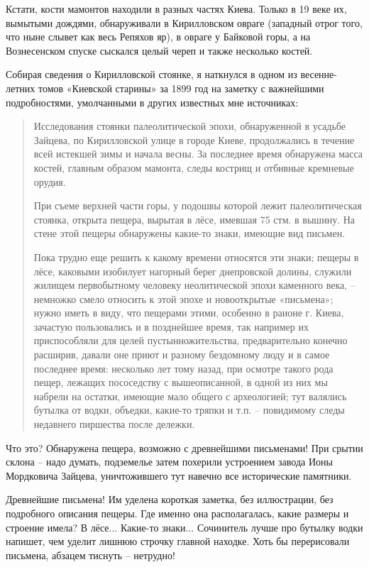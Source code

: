 Кстати, кости мамонтов находили в разных частях Киева. Только в 19 веке их, вымытыми дождями, обнаруживали в Кирилловском овраге (западный отрог того, что ныне слывет как весь Репяхов яр), в овраге у Байковой горы, а на Вознесенском спуске сыскался целый череп и также несколько костей.

Собирая сведения о Кирилловской стоянке, я наткнулся в одном из весенне-летних томов «Киевской старины» за 1899 год на заметку с важнейшими подробностями, умолчанными в других известных мне источниках:
 
\begin{quotation}
Исследования стоянки палеолитической эпохи, обнаруженной в усадьбе Зайцева, по Кирилловской улице в городе Киеве, продолжались в течение всей истекшей зимы и начала весны. За последнее время обнаружена масса костей, главным образом мамонта, следы кострищ и отбивные кремневые орудия.

При съеме верхней части горы, у подошвы которой лежит палеолитическая стоянка, открыта пещера, вырытая в лёсе, имевшая 75 стм. в вышину. На стене этой пещеры обнаружены какие-то знаки, имеющие вид письмен.

Пока трудно еще решить к какому времени относятся эти знаки; пещеры в лёсе, каковыми изобилует нагорный берег днепровской долины, служили жилищем первобытному человеку неолитической эпохи каменного века, – немножко смело относить к этой эпохе и новооткрытые «письмена»; нужно иметь в виду, что пещерами этими, особенно в раионе г. Киева, зачастую пользовались и в позднейшее время, так например их приспособляли для целей пустынножительства, предварительно конечно расширив, давали оне приют и разному бездомному люду и в самое последнее время: несколько лет тому назад, при осмотре такого рода пещер, лежащих пососедству с вышеописанной, в одной из них мы набрели на остатки, имеющие мало общего с археологией; тут валялись бутылка от водки, объедки, какие-то тряпки и т.п. – повидимому следы недавнего пиршества после дележки.
\end{quotation}

Что это? Обнаружена пещера, возможно с древнейшими письменами! При срытии склона – надо думать, подземелье затем похерили устроением завода Ионы Мордковича Зайцева, уничтожившего тут навечно все исторические памятники.

Древнейшие письмена! Им уделена короткая заметка, без иллюстрации, без подробного описания пещеры. Где именно она располагалась, какие размеры и строение имела? В лёсе... Какие-то знаки... Сочинитель лучше про бутылку водки напишет, чем уделит лишнюю строчку главной находке. Хоть бы перерисовали письмена, абзацем тиснуть – нетрудно!


